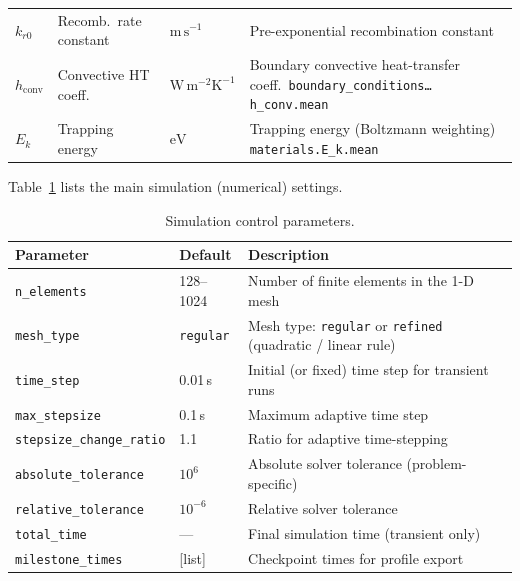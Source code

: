 \documentclass[11pt,a4paper]{article}
\begin{document}
\begin{table}[htbp]
\begin{tabularx}{\textwidth}{@{} l l l X @{}}
$k_{r0}$      & Recomb.\ rate constant      & $\mathrm{m\,s^{-1}}$        & Pre-exponential recombination constant \\[2pt]
$h_\mathrm{conv}$ & Convective HT coeff.   & $\mathrm{W\,m^{-2}K^{-1}}$  & Boundary convective heat-transfer coeff.\ \newline \texttt{boundary\_conditions\ldots h\_conv.mean} \\[2pt]
$E_k$         & Trapping energy             & $\mathrm{eV}$               & Trapping energy (Boltzmann weighting) \newline \texttt{materials.E\_k.mean} \\
\bottomrule
\end{tabularx}
\end{table}

\noindent
Table~\ref{tab:sim_params} lists the main simulation (numerical) settings.

\begin{table}[htbp]
\centering
\caption{Simulation control parameters.}
\label{tab:sim_params}
\small
\begin{tabularx}{\textwidth}{@{} l l X @{}}
\toprule
\textbf{Parameter} & \textbf{Default} & \textbf{Description} \\
\midrule
\texttt{n\_elements}        & 128--1024   & Number of finite elements in the 1-D mesh \\
\texttt{mesh\_type}         & \texttt{regular} & Mesh type: \texttt{regular} or \texttt{refined} (quadratic / linear rule) \\
\texttt{time\_step}         & 0.01\,s     & Initial (or fixed) time step for transient runs \\
\texttt{max\_stepsize}      & 0.1\,s      & Maximum adaptive time step \\
\texttt{stepsize\_change\_ratio} & 1.1    & Ratio for adaptive time-stepping \\
\texttt{absolute\_tolerance}& $10^{6}$    & Absolute solver tolerance (problem-specific) \\
\texttt{relative\_tolerance}& $10^{-6}$   & Relative solver tolerance \\
\texttt{total\_time}        & ---         & Final simulation time (transient only) \\
\texttt{milestone\_times}   & [list]      & Checkpoint times for profile export \\
\bottomrule
\end{tabularx}
\end{table}
\end{document}
